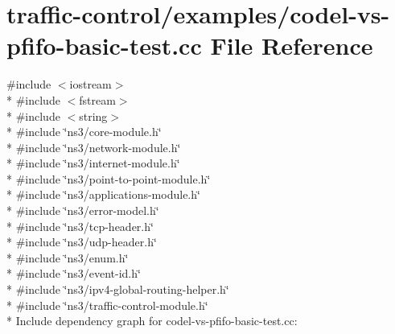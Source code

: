 \hypertarget{codel-vs-pfifo-basic-test_8cc}{}\section{traffic-\/control/examples/codel-\/vs-\/pfifo-\/basic-\/test.cc File Reference}
\label{codel-vs-pfifo-basic-test_8cc}
{\ttfamily \#include $<$iostream$>$}\\*
{\ttfamily \#include $<$fstream$>$}\\*
{\ttfamily \#include $<$string$>$}\\*
{\ttfamily \#include \char`\"{}ns3/core-\/module.\+h\char`\"{}}\\*
{\ttfamily \#include \char`\"{}ns3/network-\/module.\+h\char`\"{}}\\*
{\ttfamily \#include \char`\"{}ns3/internet-\/module.\+h\char`\"{}}\\*
{\ttfamily \#include \char`\"{}ns3/point-\/to-\/point-\/module.\+h\char`\"{}}\\*
{\ttfamily \#include \char`\"{}ns3/applications-\/module.\+h\char`\"{}}\\*
{\ttfamily \#include \char`\"{}ns3/error-\/model.\+h\char`\"{}}\\*
{\ttfamily \#include \char`\"{}ns3/tcp-\/header.\+h\char`\"{}}\\*
{\ttfamily \#include \char`\"{}ns3/udp-\/header.\+h\char`\"{}}\\*
{\ttfamily \#include \char`\"{}ns3/enum.\+h\char`\"{}}\\*
{\ttfamily \#include \char`\"{}ns3/event-\/id.\+h\char`\"{}}\\*
{\ttfamily \#include \char`\"{}ns3/ipv4-\/global-\/routing-\/helper.\+h\char`\"{}}\\*
{\ttfamily \#include \char`\"{}ns3/traffic-\/control-\/module.\+h\char`\"{}}\\*
Include dependency graph for codel-\/vs-\/pfifo-\/basic-\/test.cc\+:
